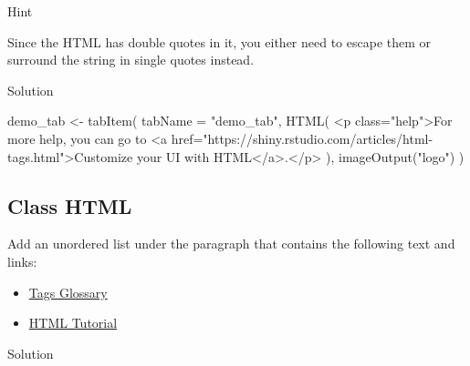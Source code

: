 \documentclass[
  oneside]{book}
\newenvironment{Shaded}{\begin{snugshade}}{\end{snugshade}}
\newcommand{\AttributeTok}[1]{\textcolor[rgb]{0.77,0.63,0.00}{#1}}
\newcommand{\FunctionTok}[1]{\textcolor[rgb]{0.00,0.00,0.00}{#1}}
\newcommand{\NormalTok}[1]{#1}
\newcommand{\OtherTok}[1]{\textcolor[rgb]{0.56,0.35,0.01}{#1}}
\newcommand{\StringTok}[1]{\textcolor[rgb]{0.31,0.60,0.02}{#1}}
\providecommand{\tightlist}{%
  \setlength{\itemsep}{0pt}\setlength{\parskip}{0pt}}
\begin{document}
Hint

Since the HTML has double quotes in it, you either need to escape them or surround the string in single quotes instead.

Solution

\begin{Shaded}
\begin{Highlighting}[]
\NormalTok{demo\_tab }\OtherTok{\textless{}{-}} \FunctionTok{tabItem}\NormalTok{(}
  \AttributeTok{tabName =} \StringTok{"demo\_tab"}\NormalTok{,}
  \FunctionTok{HTML}\NormalTok{(}
    \StringTok{\textquotesingle{}\textless{}p class="help"\textgreater{}For more help, you can go to \textless{}a href="https://shiny.rstudio.com/articles/html{-}tags.html"\textgreater{}Customize your UI with HTML\textless{}/a\textgreater{}.\textless{}/p\textgreater{}\textquotesingle{}}
\NormalTok{  ),}
  \FunctionTok{imageOutput}\NormalTok{(}\StringTok{"logo"}\NormalTok{)}
\NormalTok{)}
\end{Highlighting}
\end{Shaded}

\hypertarget{class-html}{%
\subsection*{Class HTML}\label{class-html}}

Add an unordered list under the paragraph that contains the following text and links:

\begin{itemize}
\tightlist
\item
  \href{https://shiny.rstudio.com/articles/tag-glossary.html}{Tags Glossary}
\item
  \href{https://www.w3schools.com/html/}{HTML Tutorial}
\end{itemize}

Solution
\end{document}

